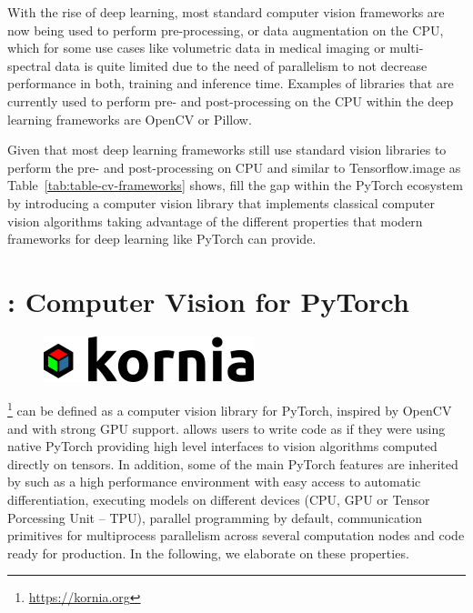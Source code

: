 With the rise of deep learning, most standard computer vision frameworks are now being used to perform pre-processing, or data augmentation on the CPU, which for some use cases like volumetric data in medical imaging or multi-spectral data is quite limited due to the need of parallelism to not decrease performance in both, training and inference time. Examples of libraries that are currently used to perform pre- and post-processing on the CPU within the deep learning frameworks are OpenCV or Pillow.

Given that most  deep learning frameworks still use standard vision libraries to perform the pre- and post-processing on CPU and similar to Tensorflow.image {as Table~\ref{tab:table-cv-frameworks} shows, \lib{} fill the gap} within the PyTorch ecosystem by introducing a computer vision library that implements classical computer vision algorithms taking advantage of the different properties that modern frameworks for deep learning like PyTorch can provide.


\section{\lib: Computer Vision for PyTorch}
\label{section:kornia}

\begin{figure}[h]
\centering
\includegraphics[scale=0.30]{main/chapter03/data/kornia_logo.png}
\label{fig:kornia_logo}
\end{figure}

\lib\footnote{\url{https://kornia.org}} can be defined as a computer vision library for PyTorch, inspired by OpenCV and with strong GPU support. \lib{} allows users to write code as if they were using native PyTorch providing high level interfaces to vision algorithms computed directly on tensors. In addition, some of the main PyTorch features are inherited by \lib{} such as a high performance environment with easy access to automatic differentiation, executing models on different devices (CPU, GPU or Tensor Porcessing Unit -- TPU), parallel programming by default, communication primitives for multiprocess parallelism across several computation nodes and code ready for production. In the following, we elaborate on these properties.

